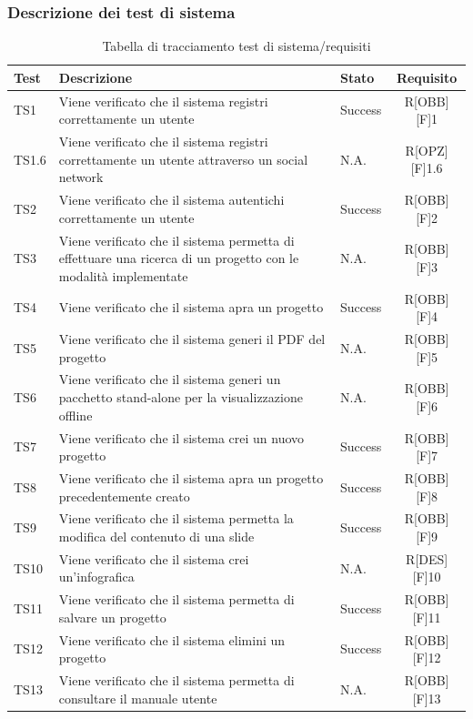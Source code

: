 \subsubsection{Descrizione dei test di sistema}
\begin{center}
	\begin{table}[h]
		\begin{tabular}{|l|p{}|l|c|}
			\toprule
			
			\textbf{Test} & \textbf{Descrizione} & \textbf{Stato} & \textbf{Requisito} \\
			
			\midrule
			TS1 & Viene verificato che il sistema registri correttamente un utente & Success & R[OBB][F]1\\ \midrule
			TS1.6 & Viene verificato che il sistema registri correttamente un utente attraverso un social network & N.A. & R[OPZ][F]1.6\\ \midrule
			TS2 & Viene verificato che il sistema autentichi correttamente un utente & Success & R[OBB][F]2\\  \midrule
			TS3	& Viene verificato che il sistema permetta di effettuare una ricerca di un progetto con le modalità implementate & N.A. & R[OBB][F]3\\ \midrule
			TS4	& Viene verificato che il sistema apra un progetto & Success & R[OBB][F]4\\ \midrule
			TS5 & Viene verificato che il sistema generi il PDF del progetto & N.A. & R[OBB][F]5\\ \midrule
			TS6 & Viene verificato che il sistema generi un pacchetto stand-alone per la visualizzazione offline & N.A. & R[OBB][F]6\\ \midrule
			TS7 & Viene verificato che il sistema crei un nuovo progetto & Success & R[OBB][F]7\\ \midrule
			TS8 & Viene verificato che il sistema apra un progetto precedentemente creato & Success & R[OBB][F]8\\ \midrule
			TS9 & Viene verificato che il sistema permetta la modifica del contenuto di una \gls{slide} & Success & R[OBB][F]9\\ \midrule
			TS10 & Viene verificato che il sistema crei un'\gls{infografica} & N.A. & R[DES][F]10\\ \midrule
			TS11 & Viene verificato che il sistema permetta di salvare un progetto & Success & R[OBB][F]11\\ \midrule
			TS12 & Viene verificato che il sistema elimini un progetto & Success & R[OBB][F]12\\ \midrule
			TS13 & Viene verificato che il sistema permetta di consultare il manuale utente & N.A. & R[OBB][F]13\\
			
						
			\bottomrule
			
		\end{tabular}
		\caption{Tabella di tracciamento test di sistema/requisiti}
		
	\end{table}
	
\end{center}

